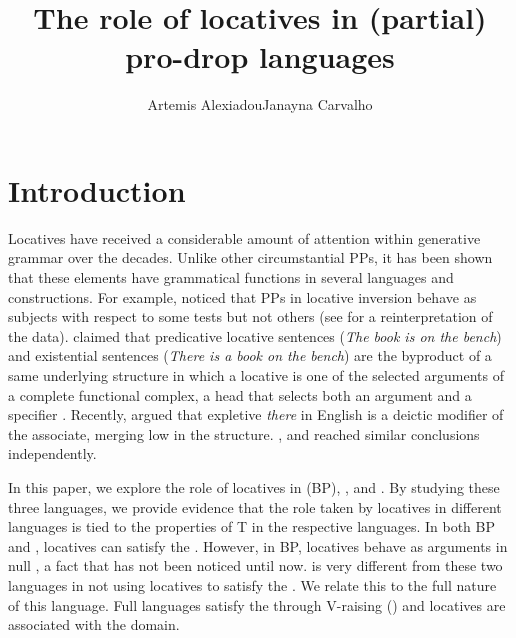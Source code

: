 \documentclass[output=paper]{LSP/langsci}
\author{Artemis Alexiadou\affiliation{Humboldt-Universität zu Berlin/Leibniz-Center General Linguistics (ZAS)}\lastand Janayna Carvalho\affiliation{Universidade de São Paulo}
}
\title{The role of locatives in (partial) pro-drop languages}
\begin{document}

\section{Introduction}\label{§1.alexiadou}

Locatives have received a considerable amount of attention within generative grammar over the decades. Unlike other circumstantial PPs, it has been shown that these elements have grammatical functions in several languages and constructions. For example, \citet{Stowell1981} noticed that PPs in locative inversion behave as subjects with respect to some tests but not others (see \citealt{Rizzi2007} for a reinterpretation of the data). \citet{Freeze1992} claimed that predicative locative sentences (\textit{The book is on the bench}) and existential sentences (\textit{There is a book on the bench}) are the byproduct of a same underlying structure in which a locative is one of the selected arguments of a complete functional complex, a head that selects both an argument and a specifier \citep{Chomsky1985}. Recently, \citet{Kayne2008} argued that expletive \textit{there} in English is a deictic modifier of the associate, merging low in the structure. \citet{Richards2007,Deal2009}, and \citet{AlexiadouSchaefer2011} reached similar conclusions independently.

In this paper, we explore the role of locatives in  (BP), , and . By studying these three languages, we provide evidence that the role taken by locatives in different languages is tied to the properties of T in the respective languages. In both BP and , locatives can satisfy the . However, in BP, locatives behave as arguments in null , a fact that has not been noticed until now.  is very different from these two languages in not using locatives to satisfy the . We relate this to the full  nature of this language. Full  languages satisfy the  through V-raising (\citealt{AlexiadouAnagnostopoulou1998}) and locatives are associated with the  domain.
\end{document}
